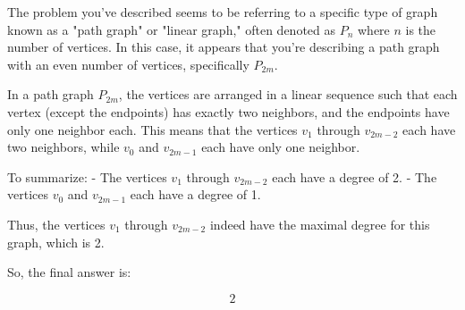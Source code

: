 The problem you've described seems to be referring to a specific type of graph known as a "path graph" or "linear graph," often denoted as \( P_n \) where \( n \) is the number of vertices. In this case, it appears that you're describing a path graph with an even number of vertices, specifically \( P_{2m} \).

In a path graph \( P_{2m} \), the vertices are arranged in a linear sequence such that each vertex (except the endpoints) has exactly two neighbors, and the endpoints have only one neighbor each. This means that the vertices \( v_1 \) through \( v_{2m-2} \) each have two neighbors, while \( v_0 \) and \( v_{2m-1} \) each have only one neighbor.

To summarize:
- The vertices \( v_1 \) through \( v_{2m-2} \) each have a degree of 2.
- The vertices \( v_0 \) and \( v_{2m-1} \) each have a degree of 1.

Thus, the vertices \( v_1 \) through \( v_{2m-2} \) indeed have the maximal degree for this graph, which is 2.

So, the final answer is:

\[
\boxed{2}
\]